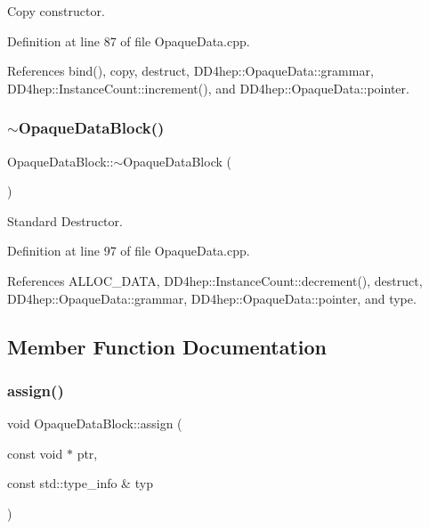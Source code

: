 Copy constructor. 



Definition at line 87 of file Opaque\+Data.\+cpp.



References bind(), copy, destruct, D\+D4hep\+::\+Opaque\+Data\+::grammar, D\+D4hep\+::\+Instance\+Count\+::increment(), and D\+D4hep\+::\+Opaque\+Data\+::pointer.

\hypertarget{class_d_d4hep_1_1_opaque_data_block_a175f12bf6af71e59c1334cbb4099b4b3}{}\label{class_d_d4hep_1_1_opaque_data_block_a175f12bf6af71e59c1334cbb4099b4b3} 
\subsubsection{\texorpdfstring{$\sim$\+Opaque\+Data\+Block()}{~OpaqueDataBlock()}}
{\footnotesize\ttfamily Opaque\+Data\+Block\+::$\sim$\+Opaque\+Data\+Block (\begin{DoxyParamCaption}{ }\end{DoxyParamCaption})}



Standard Destructor. 



Definition at line 97 of file Opaque\+Data.\+cpp.



References A\+L\+L\+O\+C\+\_\+\+D\+A\+TA, D\+D4hep\+::\+Instance\+Count\+::decrement(), destruct, D\+D4hep\+::\+Opaque\+Data\+::grammar, D\+D4hep\+::\+Opaque\+Data\+::pointer, and type.



\subsection{Member Function Documentation}
\hypertarget{class_d_d4hep_1_1_opaque_data_block_a3ba52c95bc948f9739239a29b2cc5a82}{}\label{class_d_d4hep_1_1_opaque_data_block_a3ba52c95bc948f9739239a29b2cc5a82} 
\subsubsection{\texorpdfstring{assign()}{assign()}}
{\footnotesize\ttfamily void Opaque\+Data\+Block\+::assign (\begin{DoxyParamCaption}\item[{const void $\ast$}]{ptr,  }\item[{const std\+::type\+\_\+info \&}]{typ }\end{DoxyParamCaption})}



